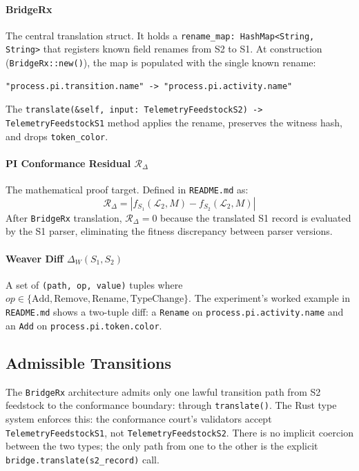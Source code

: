 \paragraph{BridgeRx}
The central translation struct. It holds a
\texttt{rename\_map: HashMap<String, String>} that registers known field renames from
S2 to S1. At construction (\texttt{BridgeRx::new()}), the map is populated with the
single known rename:
\begin{verbatim}
"process.pi.transition.name" -> "process.pi.activity.name"
\end{verbatim}
The \texttt{translate(\&self, input: TelemetryFeedstockS2) -> TelemetryFeedstockS1}
method applies the rename, preserves the witness hash, and drops \texttt{token\_color}.

\paragraph{PI Conformance Residual $\mathcal{R}_{\Delta}$}
The mathematical proof target. Defined in \texttt{README.md} as:
\[
    \mathcal{R}_{\Delta} = |f_{S_1}(\mathcal{L}_2, M) - f_{S_2}(\mathcal{L}_2, M)|
\]
After \texttt{BridgeRx} translation, $\mathcal{R}_{\Delta} = 0$ because the
translated S1 record is evaluated by the S1 parser, eliminating the fitness
discrepancy between parser versions.

\paragraph{Weaver Diff $\Delta_W(S_1, S_2)$}
A set of \texttt{(path, op, value)} tuples where
$op \in \{\text{Add}, \text{Remove}, \text{Rename}, \text{TypeChange}\}$.
The experiment's worked example in \texttt{README.md} shows a two-tuple diff:
a \texttt{Rename} on \texttt{process.pi.activity.name} and an \texttt{Add} on
\texttt{process.pi.token.color}.

\subsection{Admissible Transitions}
\label{sec:otel-weaver-exp-002-diff-to-residual-arch-transitions}

The \texttt{BridgeRx} architecture admits only one lawful transition path from
S2 feedstock to the conformance boundary: through \texttt{translate()}. The Rust
type system enforces this: the conformance court's validators accept
\texttt{TelemetryFeedstockS1}, not \texttt{TelemetryFeedstockS2}. There is no
implicit coercion between the two types; the only path from one to the other is
the explicit \texttt{bridge.translate(s2\_record)} call.

